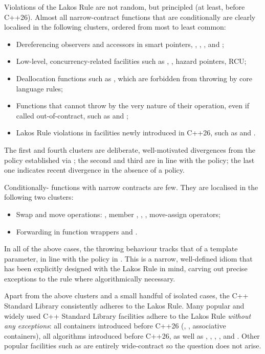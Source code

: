 Violations of the Lakos Rule are not random, but principled (at least, before C++26). Almost all narrow-contract functions that are conditionally  are clearly localised in the following clusters, ordered from most to least common:
\begin{itemize}
\item Dereferencing observers and accessors in smart pointers, ,  , , and ;
\item Low-level, concurrency-related facilities such as , , hazard pointers, RCU;
\item Deallocation functions such as , which are forbidden from throwing by core language rules;
\item Functions that cannot throw by the very nature of their operation, even if called out-of-contract, such as  and ;
\item Lakos Rule violations in facilities newly introduced in C++26, such as  and .
\end{itemize}
The first and fourth clusters are deliberate, well-motivated divergences from the  policy established via \cite{P0884R0}; the second and third are in line with the policy; the last one indicates recent divergence in the absence of a policy.

Conditionally- functions with narrow contracts are few. They are localised in the following two clusters:
\begin{itemize}
\item Swap and move operations: , member , \mbox{}, , move-assign operators;
\item Forwarding  in function wrappers  and \mbox{}.
\end{itemize}
In all of the above cases, the throwing behaviour tracks that of a template parameter, in line with the policy in \cite{P0884R0}. This is a narrow, well-defined idiom that has been explicitly designed with the Lakos Rule in mind, carving out precise exceptions to the rule where algorithmically necessary.

Apart from the above clusters and a small handful of isolated cases, the C++ Standard Library consistently adheres to the Lakos Rule. Many popular and widely used C++ Standard Library facilities adhere to the Lakos Rule \emph{without any exceptions}: all containers introduced before C++26 (, , associative containers), all algorithms introduced before C++26, as well as , , ,  , and . Other popular facilities such as  are entirely wide-contract so the question does not arise.

